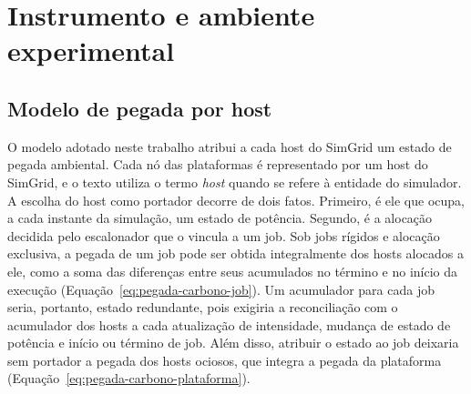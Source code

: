 

\newcommand{\sla}{\textbackslash}

\newcommand{\cmd}[1]{\textsf{#1}}

\newcommand{\pkg}[1]{\textsf{#1}}

\newcommand{\ltxcmd}[1]{\cmd{\sla{}#1}}

\chapter{Instrumento e ambiente experimental}
\label{chap:modelo}

\section{Modelo de pegada por host}
\label{sec:modelo-pegada-host}

O modelo adotado neste trabalho atribui a cada host do SimGrid um estado
de pegada ambiental. Cada nó das plataformas é representado por um host do SimGrid, e o texto utiliza o termo
\textit{host} quando se refere à entidade do simulador. A escolha do host como portador decorre de dois fatos. 
Primeiro, é ele que ocupa, a cada instante 
da simulação, um estado de potência. Segundo, é a alocação decidida pelo escalonador que o vincula a um job. 
Sob jobs rígidos e alocação exclusiva, a pegada 
de um job pode ser obtida integralmente dos hosts alocados a ele, como a soma das diferenças entre seus acumulados
no término e no início da execução (Equação~\ref{eq:pegada-carbono-job}). Um acumulador
para cada job seria, portanto, estado redundante, pois exigiria a reconciliação com o acumulador dos hosts a
cada atualização de intensidade, mudança de estado de potência e início ou término de job.
Além disso, atribuir o estado ao job deixaria sem portador a pegada dos hosts ociosos, que integra
a pegada da plataforma (Equação~\ref{eq:pegada-carbono-plataforma}).

